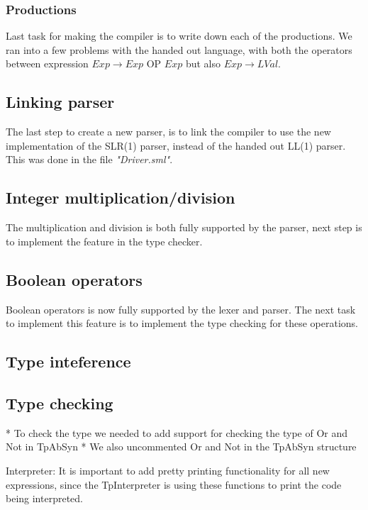 \documentclass[10pt]{article}
\begin{document}

\subsubsection{Productions}
Last task for making the compiler is to write down each of the productions. We ran into a few problems with the handed out language, with both the operators between expression $Exp \rightarrow Exp \text{ OP } Exp$ but also $Exp \rightarrow LVal$.

\subsection{Linking parser}
The last step to create a new parser, is to link the compiler to use the new implementation of the SLR(1) parser, instead of the handed out LL(1) parser. This was done in the file \textit{"Driver.sml"}.

\subsection{Integer multiplication/division}
The multiplication and division is both fully supported by the parser, next step is to implement the feature in the type checker.

\subsection{Boolean operators}
Boolean operators is now fully supported by the lexer and parser. The next task to implement this feature is to implement the type checking for these operations.

\subsection{Type inteference}

\subsection{Type checking}
* To check the type we needed to add support for checking the type of Or and Not in TpAbSyn
* We also uncommented Or and Not in the TpAbSyn structure

Interpreter:
It is important to add pretty printing functionality for all new expressions, since the TpInterpreter is using these functions to print the code being interpreted.
\end{document}
